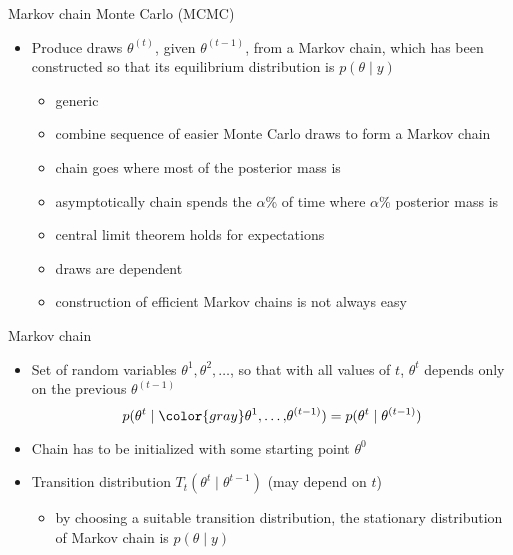 \documentclass[finnish,english,t]{beamer}
\begin{document}
  
\begin{frame}{Markov chain Monte Carlo (MCMC)}

  \vspace{-0.5\baselineskip}
  \begin{itemize}
  \item Produce draws $\theta^{(t)}$, given $\theta^{(t-1)}$, from a
    Markov chain, which has been constructed so that its equilibrium
    distribution is $p(\theta \mid y)$
    \begin{itemize}
    \item<2->[+] generic
    \item<2->[+] combine sequence of easier Monte Carlo draws to form a Markov chain
    \item<3->[+] chain goes where most of the posterior mass is
    \item<3->[+] asymptotically chain spends the $\alpha$\% of time where
      $\alpha$\% posterior mass is
    \item<4->[+] central limit theorem holds for expectations 
    \item<5->[-] draws are dependent
    \item<5->[-] construction of efficient Markov chains is not always
      easy
    \end{itemize}
\end{itemize}

\end{frame}

\begin{frame}{Markov chain}

  \begin{itemize}
  \item Set of random variables $\theta^1,\theta^2,\ldots$, so that
    with all values of $t$, $\theta^t$ depends only on the previous $\theta^{(t-1)}$
    \begin{equation*}
      p(\theta^t \mid {\color{gray}\theta^1,\ldots,}\theta^{(t-1)})=p(\theta^t \mid \theta^{(t-1)})
    \end{equation*}
  \item<2-> Chain has to be initialized with some starting point $\theta^0$
  \item<3-> Transition distribution $T_t(\theta^t \mid \theta^{t-1})$ (may
    depend on $t$)
    \begin{itemize}
    \item by choosing a suitable transition distribution, the
      stationary distribution of Markov chain is $p(\theta \mid y)$
    \end{itemize}
  \end{itemize}

\end{frame}
\end{document}
